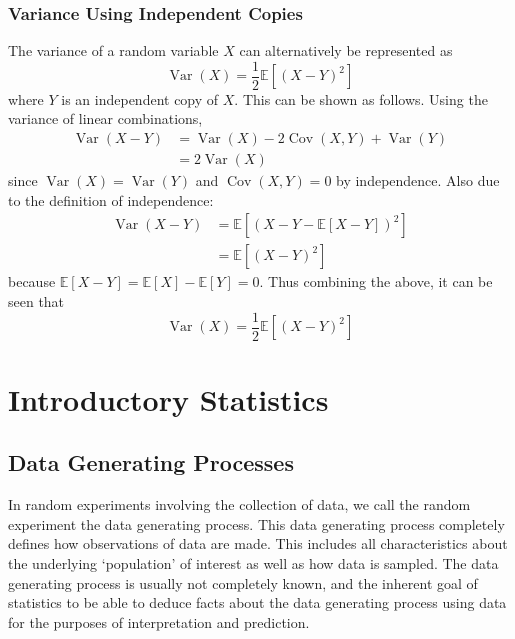 \documentclass[11pt]{report} %
\begin{document}
\subsection{Variance Using Independent Copies}

The variance of a random variable $X$ can alternatively be represented as
\begin{equation}
\operatorname{Var}\left(X\right) = \dfrac{1}{2}\mathbb{E}\left[\left(X - Y\right)^{2}\right]
\end{equation}
where $Y$ is an independent copy of $X$. This can be shown as follows. Using the variance of linear combinations,
\begin{align}
\operatorname{Var}\left(X - Y\right) &= \operatorname{Var}\left(X\right) - 2\operatorname{Cov}\left(X, Y\right) + \operatorname{Var}\left(Y\right) \\
&= 2\operatorname{Var}\left(X\right)
\end{align}
since $\operatorname{Var}\left(X\right) = \operatorname{Var}\left(Y\right)$ and $\operatorname{Cov}\left(X, Y\right) = 0$ by independence. Also due to the definition of independence:
\begin{align}
\operatorname{Var}\left(X - Y\right) &= \mathbb{E}\left[\left(X - Y - \mathbb{E}\left[X - Y\right]\right)^{2}\right] \\
&= \mathbb{E}\left[\left(X - Y\right)^{2}\right]
\end{align}
because $\mathbb{E}\left[X - Y\right] = \mathbb{E}\left[X\right] - \mathbb{E}\left[Y\right] = 0$. Thus combining the above, it can be seen that
\begin{equation}
\operatorname{Var}\left(X\right) = \dfrac{1}{2}\mathbb{E}\left[\left(X - Y\right)^{2}\right]
\end{equation}


\chapter{Introductory Statistics}

\section{Data Generating Processes}

In random experiments involving the collection of data, we call the random experiment the data generating process. This data generating process completely defines how observations of data are made. This includes all characteristics about the underlying `population' of interest as well as how data is sampled. The data generating process is usually not completely known, and the inherent goal of statistics to be able to deduce facts about the data generating process using data for the purposes of interpretation and prediction.
\end{document}
